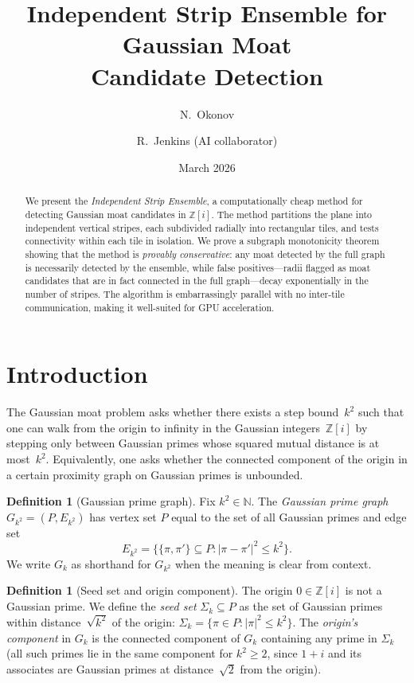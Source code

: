 \documentclass[11pt,a4paper]{article}
\title{Independent Strip Ensemble for Gaussian Moat\\Candidate Detection}
\author{N.~Okonov \and R.~Jenkins (AI collaborator)}
\date{March 2026}
\theoremstyle{definition}
\newtheorem{definition}[theorem]{Definition}
\theoremstyle{remark}
\newcommand{\Zi}{\mathbb{Z}[i]}
\newcommand{\N}{\mathbb{N}}
\begin{document}
\maketitle

\begin{abstract}
We present the \emph{Independent Strip Ensemble}, a computationally cheap
method for detecting Gaussian moat candidates in $\Zi$.  The method
partitions the plane into independent vertical stripes, each subdivided
radially into rectangular tiles, and tests connectivity within each tile
in isolation.  We prove a subgraph monotonicity theorem showing that
the method is \emph{provably conservative}: any moat detected by the
full graph is necessarily detected by the ensemble, while false
positives---radii
flagged as moat candidates that are in fact connected in the full
graph---decay exponentially in the number of stripes.  The algorithm is
embarrassingly parallel with no inter-tile communication, making it
well-suited for GPU acceleration.
\end{abstract}

\section{Introduction}\label{sec:intro}

The Gaussian moat problem asks whether there exists a step
bound~$k^2$ such that one can walk from the origin to infinity in the
Gaussian integers~$\Zi$ by stepping only between Gaussian primes whose
squared mutual distance is at most~$k^2$.  Equivalently, one asks
whether the connected component of the origin in a certain proximity
graph on Gaussian primes is unbounded.

\begin{definition}[Gaussian prime graph]
Fix $k^2 \in \N$.  The \emph{Gaussian prime graph}
$G_{k^2} = (P, E_{k^2})$ has vertex set $P$ equal to the set of all Gaussian
primes and edge set
\[
  E_{k^2} = \bigl\{\{\pi,\pi'\} \subseteq P :
         |\pi - \pi'|^2 \le k^2 \bigr\}.
\]
We write $G_k$ as shorthand for $G_{k^2}$ when the meaning is clear
from context.
\end{definition}

\begin{definition}[Seed set and origin component]\label{def:seed}
The origin $0 \in \Zi$ is not a Gaussian prime.  We define the
\emph{seed set} $\Sigma_k \subseteq P$ as the set of Gaussian primes
within distance~$\sqrt{k^2}$ of the origin:
$\Sigma_k = \{\pi \in P : |\pi|^2 \le k^2\}$.
The \emph{origin's component} in $G_k$ is the connected component
of $G_k$ containing any prime in $\Sigma_k$ (all such primes lie in
the same component for $k^2 \ge 2$, since $1+i$ and its associates
are Gaussian primes at distance~$\sqrt{2}$ from the origin).
\end{definition}
\end{document}
